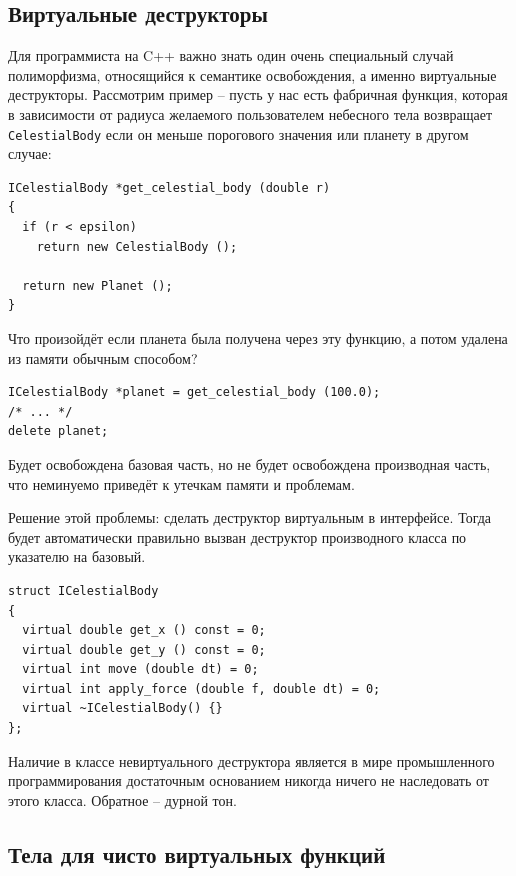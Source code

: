 \documentclass[a4paper,12pt,oneside]{book}
\begin{document}
\subsection{Виртуальные деструкторы}\label{VirtDestr}

Для программиста на C++ важно знать один очень специальный случай полиморфизма, относящийся к семантике освобождения, а именно виртуальные деструкторы. Рассмотрим пример – пусть у нас есть фабричная функция, которая в зависимости от радиуса желаемого пользователем небесного тела возвращает \lstinline!CelestialBody! если он меньше порогового значения или планету в другом случае:

\begin{lstlisting}
ICelestialBody *get_celestial_body (double r)
{
  if (r < epsilon)
    return new CelestialBody ();

  return new Planet ();
}
\end{lstlisting}

Что произойдёт если планета была получена через эту функцию, а потом удалена из памяти обычным способом?

\begin{lstlisting}
ICelestialBody *planet = get_celestial_body (100.0);
/* ... */
delete planet;
\end{lstlisting}

Будет освобождена базовая часть, но не будет освобождена производная часть, что неминуемо приведёт к утечкам памяти и проблемам. 

Решение этой проблемы: сделать деструктор виртуальным в интерфейсе. Тогда будет автоматически правильно вызван деструктор производного класса по указателю на базовый.

\begin{lstlisting}
struct ICelestialBody
{
  virtual double get_x () const = 0;
  virtual double get_y () const = 0;
  virtual int move (double dt) = 0;
  virtual int apply_force (double f, double dt) = 0;
  virtual ~ICelestialBody() {}
};
\end{lstlisting}

Наличие в классе невиртуального деструктора является в мире промышленного программирования достаточным основанием никогда ничего не наследовать от этого класса. Обратное – дурной тон. 

\subsection{Тела для чисто виртуальных функций}\label{VirtdestrBody}
\end{document}
